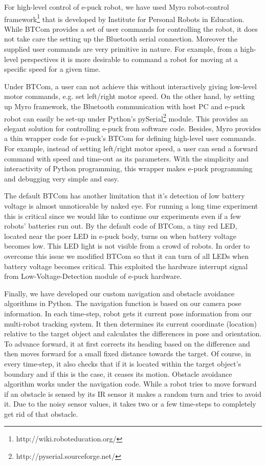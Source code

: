 For high-level control of e-puck robot, we have used Myro robot-control framework\footnote{http://wiki.roboteducation.org/} that is developed by Institute for Personal Robots in Education. While BTCom provides a set of user commands for controlling the robot, it does not take care the setting up the Bluetooth serial connection. Moreover the supplied user commands are very primitive in nature. For example, from a high-level perspectives it is more desirable to command a robot for moving at a specific speed for a given time.

Under BTCom, a user can not achieve this without interactively giving low-level motor commands, e.g. set left/right motor speed. On the other hand, by setting up Myro framework, the Bluetooth communication with host PC and e-puck robot can easily be set-up under Python's pySerial\footnote{http://pyserial.sourceforge.net/} module. This provides an elegant solution for controlling e-puck from software code. Besides, Myro provides a thin wrapper code for e-puck's BTCom for defining high-level user commands. For example, instead of setting left/right motor speed, a user can send a forward command with speed and time-out as its parameters. With the simplicity and interactivity of Python programming, this wrapper makes e-puck programming and debugging very simple and easy.

The default BTCom has another limitation that it's detection of low battery voltage is almost unnoticeable by naked eye. For running a long time experiment this is critical since we would like to continue our experiments even if a few robots' batteries run out. By the default code of BTCom, a tiny red LED, located near the poer LED in e-puck body, turns on when battery voltage becomes low. This LED light is not visible from a crowd of robots. In order to overcome this issue we modified BTCom so that it can turn of all LEDs when battery voltage becomes critical. This exploited the hardware interrupt signal from Low-Voltage-Detection module of e-puck hardware.

Finally, we have developed our custom navigation and obstacle avoidance algorithms in Python. The navigation function is based on our camera pose information. In each time-step, robot gets it current pose information from our multi-robot tracking system. It then determines its current coordinate (location) relative to the target object and calculates the differences in pose and orientation. To advance forward, it at first corrects its heading based on the difference and then moves forward for a small fixed distance towards the target. Of course, in every time-step, it also checks that if it is located within the target object's boundary and if this is the case, it ceases its motion. Obstacle avoidance algorithm works under the navigation code. While a robot tries to move forward if an obstacle is sensed by its IR sensor it makes a random turn and tries to avoid it. Due to the noisy sensor values, it takes two or a few time-steps to completely get rid of that obstacle.

